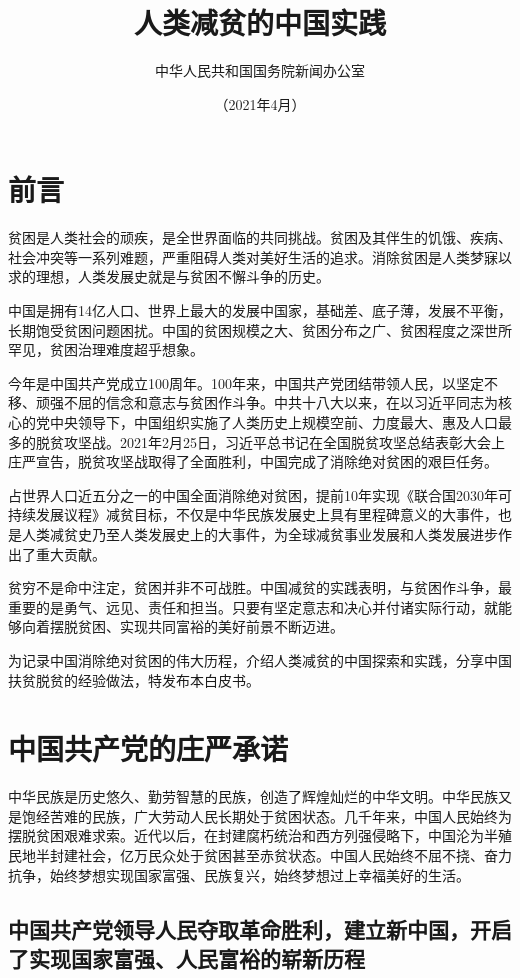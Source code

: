 \documentclass{ctexart}
\title{\textbf{人类减贫的中国实践}}
\author{中华人民共和国国务院新闻办公室}
\date{（2021年4月）}
\newcommand\sect[1]{\section*{#1}\addcontentsline{toc}{section}{#1}}
\begin{document}
\maketitle

\tableofcontents

\sect{前言}

贫困是人类社会的顽疾，是全世界面临的共同挑战。贫困及其伴生的饥饿、疾病、社会冲突等一系列难题，严重阻碍人类对美好生活的追求。消除贫困是人类梦寐以求的理想，人类发展史就是与贫困不懈斗争的历史。

中国是拥有14亿人口、世界上最大的发展中国家，基础差、底子薄，发展不平衡，长期饱受贫困问题困扰。中国的贫困规模之大、贫困分布之广、贫困程度之深世所罕见，贫困治理难度超乎想象。

今年是中国共产党成立100周年。100年来，中国共产党团结带领人民，以坚定不移、顽强不屈的信念和意志与贫困作斗争。中共十八大以来，在以习近平同志为核心的党中央领导下，中国组织实施了人类历史上规模空前、力度最大、惠及人口最多的脱贫攻坚战。2021年2月25日，习近平总书记在全国脱贫攻坚总结表彰大会上庄严宣告，脱贫攻坚战取得了全面胜利，中国完成了消除绝对贫困的艰巨任务。

占世界人口近五分之一的中国全面消除绝对贫困，提前10年实现《联合国2030年可持续发展议程》减贫目标，不仅是中华民族发展史上具有里程碑意义的大事件，也是人类减贫史乃至人类发展史上的大事件，为全球减贫事业发展和人类发展进步作出了重大贡献。

贫穷不是命中注定，贫困并非不可战胜。中国减贫的实践表明，与贫困作斗争，最重要的是勇气、远见、责任和担当。只要有坚定意志和决心并付诸实际行动，就能够向着摆脱贫困、实现共同富裕的美好前景不断迈进。

为记录中国消除绝对贫困的伟大历程，介绍人类减贫的中国探索和实践，分享中国扶贫脱贫的经验做法，特发布本白皮书。

\section{中国共产党的庄严承诺}

中华民族是历史悠久、勤劳智慧的民族，创造了辉煌灿烂的中华文明。中华民族又是饱经苦难的民族，广大劳动人民长期处于贫困状态。几千年来，中国人民始终为摆脱贫困艰难求索。近代以后，在封建腐朽统治和西方列强侵略下，中国沦为半殖民地半封建社会，亿万民众处于贫困甚至赤贫状态。中国人民始终不屈不挠、奋力抗争，始终梦想实现国家富强、民族复兴，始终梦想过上幸福美好的生活。

\subsection{中国共产党领导人民夺取革命胜利，建立新中国，开启了实现国家富强、人民富裕的崭新历程}
\end{document}
